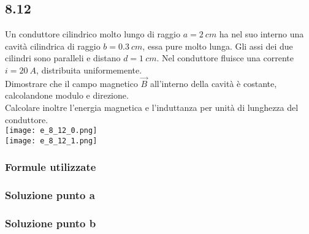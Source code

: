 \documentclass[../../main.tex]{subfiles}
\begin{document}
\subsection*{8.12}
Un conduttore cilindrico molto lungo di raggio $a = 2\ cm$ ha nel suo interno una cavità cilindrica di raggio $b = 0.3\ cm$, essa pure molto lunga. Gli assi dei due cilindri sono paralleli e distano $d = 1\ cm$. Nel conduttore fluisce una corrente $i = 20\ A$, distribuita uniformemente.\\
Dimostrare che il campo magnetico $\vec{B}$ all'interno della cavità è costante, calcolandone modulo e direzione.\\
Calcolare inoltre l'energia magnetica e l'induttanza per unità di lunghezza del conduttore.\\
\texttt{[image: e\_8\_12\_0.png]}\\
\texttt{[image: e\_8\_12\_1.png]}
\subsubsection*{Formule utilizzate}
\subsubsection*{Soluzione punto a}
\subsubsection*{Soluzione punto b}
\newpage
\end{document}
